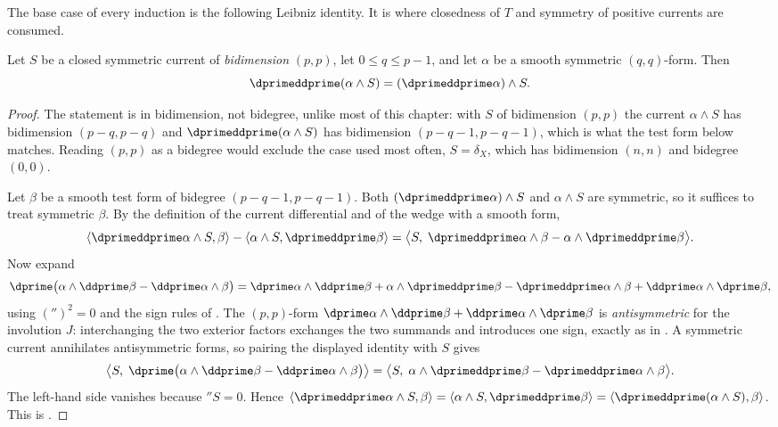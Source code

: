 The base case of every induction is the following Leibniz identity.  It is
where closedness of $T$ and symmetry of positive currents are consumed.

\begin{lemma}
\label{lem:ch16-leibniz-closed}
Let $S$ be a closed symmetric current of \emph{bidimension} $(p,p)$, let
$0\leq q\leq p-1$, and let $\alpha$ be a smooth symmetric $(q,q)$-form.  Then
\[
              \dprimeddprime(\alpha\wedge S)
              =(\dprimeddprime\alpha)\wedge S .
\]
\end{lemma}

\begin{proof}
The statement is in bidimension, not bidegree, unlike most of this chapter:
with $S$ of bidimension $(p,p)$ the current $\alpha\wedge S$ has
bidimension $(p-q,p-q)$ and $\dprimeddprime(\alpha\wedge S)$ has
bidimension $(p-q-1,p-q-1)$, which is what the test form below matches.
Reading $(p,p)$ as a bidegree would exclude the case used most often,
$S=\delta_X$, which has bidimension $(n,n)$ and bidegree $(0,0)$.

Let $\beta$ be a smooth test form of bidegree $(p-q-1,p-q-1)$.  Both
$(\dprimeddprime\alpha)\wedge S$ and $\alpha\wedge S$ are symmetric, so it
suffices to treat symmetric $\beta$.  By the definition of the current
differential and of the wedge with a smooth form,
\[
 \langle\dprimeddprime\alpha\wedge S,\beta\rangle
 -\langle\alpha\wedge S,\dprimeddprime\beta\rangle
 =\bigl\langle S,\;
   \dprimeddprime\alpha\wedge\beta-\alpha\wedge\dprimeddprime\beta
  \bigr\rangle .
\]
Now expand
\[
 \dprime\bigl(\alpha\wedge\ddprime\beta
              -\ddprime\alpha\wedge\beta\bigr)
 =\dprime\alpha\wedge\ddprime\beta
  +\alpha\wedge\dprimeddprime\beta
  -\dprimeddprime\alpha\wedge\beta
  +\ddprime\alpha\wedge\dprime\beta ,
\]
using $(\dprime)^2=0$ and the sign rules of .  The
$(p,p)$-form
$\dprime\alpha\wedge\ddprime\beta+\ddprime\alpha\wedge\dprime\beta$ is
\emph{antisymmetric} for the involution $J$: interchanging the two exterior
factors exchanges the two summands and introduces one sign, exactly as in
.  A symmetric current annihilates
antisymmetric forms, so pairing the displayed identity with $S$ gives
\[
 \bigl\langle S,\;
  \dprime\bigl(\alpha\wedge\ddprime\beta-\ddprime\alpha\wedge\beta\bigr)
 \bigr\rangle
 =\bigl\langle S,\;
   \alpha\wedge\dprimeddprime\beta-\dprimeddprime\alpha\wedge\beta
  \bigr\rangle .
\]
The left-hand side vanishes because $\dprime S=0$.  Hence
$\langle\dprimeddprime\alpha\wedge S,\beta\rangle
 =\langle\alpha\wedge S,\dprimeddprime\beta\rangle
 =\langle\dprimeddprime(\alpha\wedge S),\beta\rangle$.
This is \cite[Lemma~8.5.3]{CLD25}.
\end{proof}

